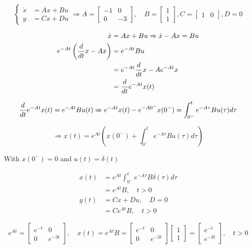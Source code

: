 \documentclass[12pt,a4paper]{article}
\begin{document}
\[
\begin{cases}
	\dot x &= Ax + Bu \\
	y &= Cx + Du
\end{cases} \Rightarrow A = \begin{bmatrix}
-1 & 0 \\ 0 & -3
\end{bmatrix},\quad B = \begin{bmatrix}
1 \\ 1
\end{bmatrix}, C = \begin{bmatrix}
1 & 0 
\end{bmatrix}, D = 0
\]

\begin{align*}
	\dot x &= Ax + Bu \Rightarrow \dot x - Ax = Bu \\ 
	e^{-At}\left({d\over dt} x - Ax\right) &= e^{-At} Bu \\
	&= e^{-At} {d\over dt} x - A e^{-At} x \\
	&= {d\over dt} e^{-At}x(t)
\end{align*}

\[
{d\over dt} e^{-At}x(t) = e^{-At}Bu(t) \Rightarrow e^{-At} x(t) - e^{-A0^-}x(0^-)  = \int_{0^-}^t e^{-A\tau}Bu(\tau)d\tau
\]

\[\Rightarrow
x(t) = e^{At} \left( x(0^-)  + \int_{0^-}^t e^{-A\tau} Bu(\tau) d\tau \right)
\]

With $x(0^-) =0$ and $u(t) = \delta (t)$

\begin{align*}
	x(t) &= e^{At} \int_{0^-}^t e^{-A\tau}B\delta(\tau)d\tau\\
	&= e^{At}B, \quad t > 0\\
	y(t) &= Cx + Du , \quad D = 0\\
	&= Ce^{At}B, \quad t > 0
\end{align*}

\[
e^{At} = \begin{bmatrix}
	e^{-t} & 0 \\
	0 & e^{-3t}
\end{bmatrix}, \quad x(t) = e^{At}B = \begin{bmatrix}
e^{-t} & 0 \\
0 & e^{-3t}
\end{bmatrix}\begin{bmatrix}
1 \\ 1
\end{bmatrix} = \begin{bmatrix}
e^{-t} \\ e^{-3t}
\end{bmatrix},\quad t > 0
\]
\end{document}
